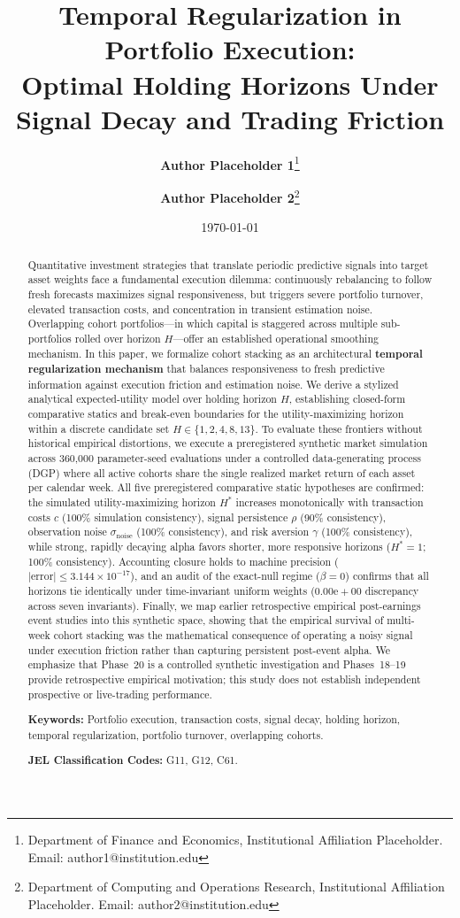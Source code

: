 \documentclass[11pt,a4paper]{article}
\title{\textbf{Temporal Regularization in Portfolio Execution: \\ Optimal Holding Horizons Under Signal Decay and Trading Friction}}
\author{
    \textbf{Author Placeholder 1}\thanks{Department of Finance and Economics, Institutional Affiliation Placeholder. Email: author1@institution.edu}
    \and
    \textbf{Author Placeholder 2}\thanks{Department of Computing and Operations Research, Institutional Affiliation Placeholder. Email: author2@institution.edu}
}
\date{\today}
\theoremstyle{definition}
\begin{document}
\maketitle

\begin{abstract}
Quantitative investment strategies that translate periodic predictive signals into target asset weights face a fundamental execution dilemma: continuously rebalancing to follow fresh forecasts maximizes signal responsiveness, but triggers severe portfolio turnover, elevated transaction costs, and concentration in transient estimation noise. Overlapping cohort portfolios---in which capital is staggered across multiple sub-portfolios rolled over horizon $H$---offer an established operational smoothing mechanism. In this paper, we formalize cohort stacking as an architectural \textbf{temporal regularization mechanism} that balances responsiveness to fresh predictive information against execution friction and estimation noise. We derive a stylized analytical expected-utility model over holding horizon $H$, establishing closed-form comparative statics and break-even boundaries for the utility-maximizing horizon within a discrete candidate set $H \in \{1, 2, 4, 8, 13\}$. To evaluate these frontiers without historical empirical distortions, we execute a preregistered synthetic market simulation across 360,000 parameter-seed evaluations under a controlled data-generating process (DGP) where all active cohorts share the single realized market return of each asset per calendar week. All five preregistered comparative static hypotheses are confirmed: the simulated utility-maximizing horizon $H^*$ increases monotonically with transaction costs $c$ (100\% simulation consistency), signal persistence $\rho$ (90\% consistency), observation noise $\sigma_{\text{noise}}$ (100\% consistency), and risk aversion $\gamma$ (100\% consistency), while strong, rapidly decaying alpha favors shorter, more responsive horizons ($H^*=1$; 100\% consistency). Accounting closure holds to machine precision ($|\text{error}| \le 3.144 \times 10^{-17}$), and an audit of the exact-null regime ($\beta=0$) confirms that all horizons tie identically under time-invariant uniform weights ($0.00\text{e}+00$ discrepancy across seven invariants). Finally, we map earlier retrospective empirical post-earnings event studies into this synthetic space, showing that the empirical survival of multi-week cohort stacking was the mathematical consequence of operating a noisy signal under execution friction rather than capturing persistent post-event alpha. We emphasize that Phase~20 is a controlled synthetic investigation and Phases~18--19 provide retrospective empirical motivation; this study does not establish independent prospective or live-trading performance.

\vspace{0.8em}
\noindent \textbf{Keywords:} Portfolio execution, transaction costs, signal decay, holding horizon, temporal regularization, portfolio turnover, overlapping cohorts.

\vspace{0.4em}
\noindent \textbf{JEL Classification Codes:} G11, G12, C61.
\end{abstract}
\end{document}
